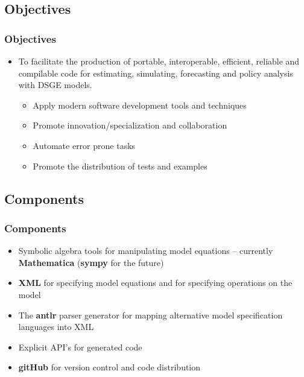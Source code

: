 \documentclass[handout]{beamer}
\newcommand{\mma}{Mathematica}
\begin{document}

\subsection{Objectives}

\begin{frame}
  \frametitle{Objectives}  

{%
\begin{itemize}
\item To facilitate  
the production of  portable, interoperable, efficient, 
 reliable and compilable code  for estimating,  
simulating,  forecasting and  policy analysis with
DSGE models.
  \begin{itemize}
  \item Apply modern software development tools and techniques
  \item Promote innovation/specialization and collaboration 
  \item Automate error prone tasks
  \item Promote the distribution of tests and examples
  \end{itemize}
\end{itemize}
}
\end{frame}



\subsection{Components}
\begin{frame}
  \frametitle{Components}  

{\small
  \begin{itemize}
\item Symbolic algebra tools for manipulating model equations
 -- currently {\bf \mma}  ({\bf sympy} for the future)
\item {\bf XML} for specifying model equations and 
for specifying operations on the model
\item The {\bf antlr} parser generator for mapping alternative 
model specification languages into  XML
\item Explicit  API's for generated code
\item {\bf gitHub} for version control and code distribution
  \end{itemize}

}
\end{frame}
\end{document}
